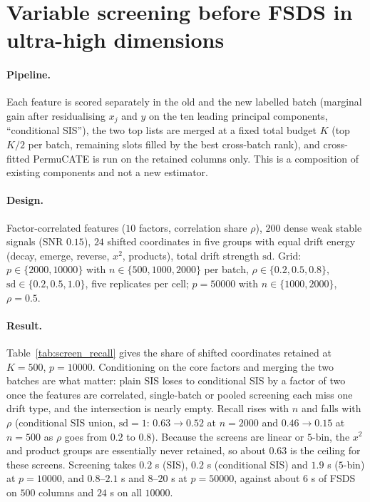 \section{Variable screening before FSDS in ultra-high dimensions}
\label{app:screen}

\paragraph{Pipeline.}
Each feature is scored separately in the old and the new labelled batch (marginal gain after residualising $x_j$ and $y$ on the ten leading principal components, ``conditional SIS''), the two top lists are merged at a fixed total budget $K$ (top $K/2$ per batch, remaining slots filled by the best cross-batch rank), and cross-fitted PermuCATE is run on the retained columns only. This is a composition of existing components and not a new estimator.

\paragraph{Design.}
Factor-correlated features ($10$ factors, correlation share $\rho$), $200$ dense weak stable signals (SNR $0.15$), $24$ shifted coordinates in five groups with equal drift energy (decay, emerge, reverse, $x^2$, products), total drift strength $\mathrm{sd}$. Grid: $p\in\{2000,10000\}$ with $n\in\{500,1000,2000\}$ per batch, $\rho\in\{0.2,0.5,0.8\}$, $\mathrm{sd}\in\{0.2,0.5,1.0\}$, five replicates per cell; $p=50000$ with $n\in\{1000,2000\}$, $\rho=0.5$.

\paragraph{Result.}
Table~\ref{tab:screen_recall} gives the share of shifted coordinates retained at $K=500$, $p=10000$. Conditioning on the core factors and merging the two batches are what matter: plain SIS loses to conditional SIS by a factor of two once the features are correlated, single-batch or pooled screening each miss one drift type, and the intersection is nearly empty. Recall rises with $n$ and falls with $\rho$ (conditional SIS union, $\mathrm{sd}=1$: $0.63\to0.52$ at $n=2000$ and $0.46\to0.15$ at $n=500$ as $\rho$ goes from $0.2$ to $0.8$). Because the screens are linear or $5$-bin, the $x^2$ and product groups are essentially never retained, so about $0.63$ is the ceiling for these screens. Screening takes $0.2$ s (SIS), $0.2$ s (conditional SIS) and $1.9$ s ($5$-bin) at $p=10000$, and $0.8$--$2.1$ s and $8$--$20$ s at $p=50000$, against about $6$ s of FSDS on $500$ columns and $24$ s on all $10000$.

